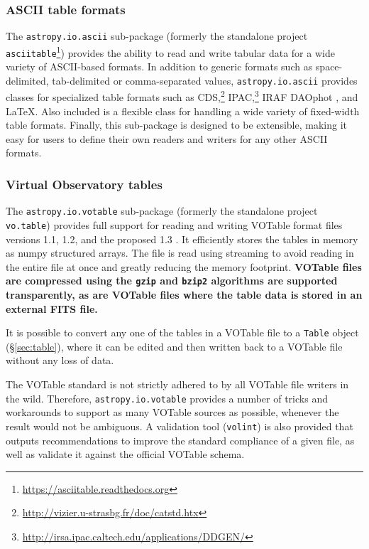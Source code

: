 \documentclass[traditabstract]{aa}
\begin{document}
\subsubsection{ASCII table formats}

\label{sec:ascii}


The \texttt{astropy.io.ascii} sub-package (formerly the standalone project
\texttt{asciitable}\footnote{\url{https://asciitable.readthedocs.org}})
provides the ability to read and write tabular data for a wide variety of
ASCII-based formats. In addition to generic formats such as space-delimited,
tab-delimited or comma-separated values, \texttt{astropy.io.ascii} provides
classes for specialized table formats such as
CDS,\footnote{\url{http://vizier.u-strasbg.fr/doc/catstd.htx}}
IPAC,\footnote{\url{http://irsa.ipac.caltech.edu/applications/DDGEN/}}
IRAF DAOphot \citep{daophot}, and LaTeX. Also included is a flexible class for handling a wide
variety of fixed-width table formats. Finally, this sub-package is designed to be
extensible, making it easy for users to define their own readers and writers for
any other ASCII formats.

\subsubsection{Virtual Observatory tables}

\label{sec:votable}


The \texttt{astropy.io.votable} sub-package (formerly the standalone
project \texttt{vo.table}) provides full support for reading and
writing VOTable format files versions 1.1, 1.2, and the proposed 1.3
\citep{ochsenbein2004votable,ochsenbein2009votable}. It efficiently
stores the tables in memory as \gls{numpy} structured arrays. The file
is read using streaming to avoid reading in the entire file at once
and greatly reducing the memory footprint.  \textbf{VOTable files are
compressed using the \texttt{gzip} and \texttt{bzip2} algorithms are
supported transparently, as are VOTable files
where the table data is stored in an external FITS file.}

It is possible to convert any one of the tables in a VOTable file to a
\texttt{Table} object (\S\ref{sec:table}), where it can be edited and then
written back to a VOTable file without any loss of data.

The VOTable standard is not strictly adhered to by all VOTable file writers in
the wild. Therefore, \texttt{astropy.io.votable} provides a number of tricks
and workarounds to support as many VOTable sources as possible, whenever the
result would not be ambiguous. A validation tool (\texttt{volint}) is also
provided that outputs recommendations to improve the standard compliance of a
given file, as well as validate it against the official VOTable schema.
\end{document}
